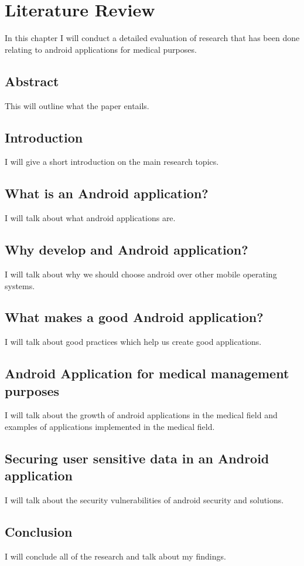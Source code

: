 \chapter{Literature Review}
In this chapter I will conduct a detailed evaluation of research that has been done relating to android applications for medical purposes.

\section{Abstract}
This will outline what the paper entails.

\section{Introduction}
I will give a short introduction on the main research topics.

\section{What is an Android application?}
I will talk about what android applications are.

\section{Why develop and Android application?}
I will talk about why we should choose android over other mobile operating systems.

\section{What makes a good Android application?}
I will talk about good practices which help us create good applications.

\section{Android Application for medical management purposes}
I will talk about the growth of android applications in the medical field and examples of applications implemented in the medical field.

\section{Securing user sensitive data in an Android application}
I will talk about the security vulnerabilities of android security and solutions. 

\section{Conclusion}
I will conclude all of the research and talk about my findings.

